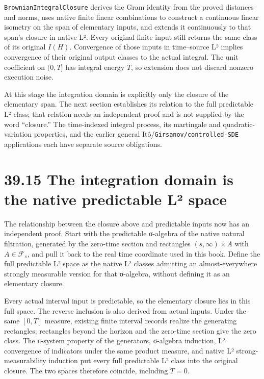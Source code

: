 \documentclass[
  english,
  11pt,
  oneside]{book}
\begin{document}
\nolinkurl{BrownianIntegralClosure} derives the Gram identity from the proved distances and norms, uses native finite linear combinations to construct a continuous linear isometry on the span of elementary inputs, and extends it continuously to that span's closure in native L². Every original finite input still returns the same class of its original \(I(H)\). Convergence of those inputs in time--source L² implies convergence of their original output classes to the actual integral. The unit coefficient on \((0,T]\) has integral energy \(T\), so extension does not discard nonzero execution noise.

At this stage the integration domain is explicitly only the closure of the elementary span. The next section establishes its relation to the full predictable L² class; that relation needs an independent proof and is not supplied by the word ``closure.'' The time-indexed integral process, its martingale and quadratic-variation properties, and the earlier general Itô/\nolinkurl{Girsanov/controlled-SDE} applications each have separate source obligations.

\section{39.15 The integration domain is the native predictable L² space}\label{the-integration-domain-is-the-native-predictable-luxb2-space}

The relationship between the closure above and predictable inputs now has an independent proof. Start with the predictable σ-algebra of the native natural filtration, generated by the zero-time section and rectangles \((s,\infty)\times A\) with \(A\in\mathcal F_s\), and pull it back to the real time coordinate used in this book. Define the full predictable L² space as the native L² classes admitting an almost-everywhere strongly measurable version for that σ-algebra, without defining it as an elementary closure.

Every actual interval input is predictable, so the elementary closure lies in this full space. The reverse inclusion is also derived from actual inputs. Under the same \([0,T]\) measure, existing finite interval records realize the generating rectangles; rectangles beyond the horizon and the zero-time section give the zero class. The π-system property of the generators, σ-algebra induction, L² convergence of indicators under the same product measure, and native L² strong-measurability induction put every full predictable L² class into the original closure. The two spaces therefore coincide, including \(T=0\).
\end{document}
